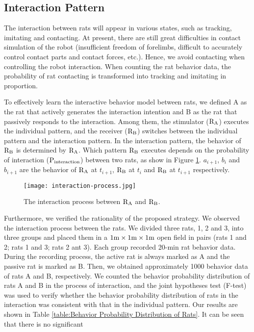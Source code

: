 \subsection{Interaction Pattern}
The interaction between rats will appear in various states, such as tracking,
imitating and contacting. At present, there are still great difficulties in
contact simulation of the robot (insufficient freedom of forelimbs, difficult to
accurately control contact parts and contact forces, etc.). Hence, we avoid
contacting when controlling the robot interaction. When counting the rat
behavior data, the probability of rat contacting is transformed into tracking
and imitating in proportion.

To effectively learn the interactive behavior model between rats, we defined A
as the rat that actively generates the interaction intention and B as the rat
that passively responds to the interaction. Among them, the stimulator (${\rm
R_A}$) executes the individual pattern, and the receiver (${\rm R_B}$) switches
between the individual pattern and the interaction pattern. In the interaction
pattern, the behavior of ${\rm R_B}$ is determined by ${\rm R_A}$. Which pattern
${\rm R_B}$ executes depends on the probability of interaction ($\rm
P_{interaction}$) between two rats, as show in Figure \ref{interaction-process}.
$a_{i+1}$, $b_i$ and $b_{i+1}$ are the behavior of ${\rm R_A}$ at $t_{i+1}$,
${\rm R_B}$ at $t_i$ and ${\rm R_B}$ at $t_{i+1}$ respectively.
\begin{figure}[h]
    \centering
    \texttt{[image: interaction-process.jpg]}
    \caption{The interaction process between $\rm R_A$ and $\rm R_B$.}
    \label{interaction-process}
\end{figure}
Furthermore, we verified the rationality of the proposed strategy. We observed
the interaction process between the rats. We divided three rats, 1, 2 and 3,
into three groups and placed them in a $1{\rm m}\times 1{\rm m}\times 1{\rm m}$
open field in pairs (rats 1 and 2; rats 1 and 3; rats 2 ant 3). Each group
recorded 20-min rat behavior data. During the recording process, the active rat
is always marked as A and the passive rat is marked as B. Then, we obtained
approximately 1000 behavior data of rats A and B, respectively. We counted the
behavior probability distribution of rats A and B in the process of interaction,
and the joint hypotheses test (F-test) was used to verify whether the behavior
probability distribution of rats in the interaction was consistent with that in
the individual pattern. Our results are shown in Table \ref{table:Behavior
Probability Distribution of Rats}. It can be seen that there is no significant
